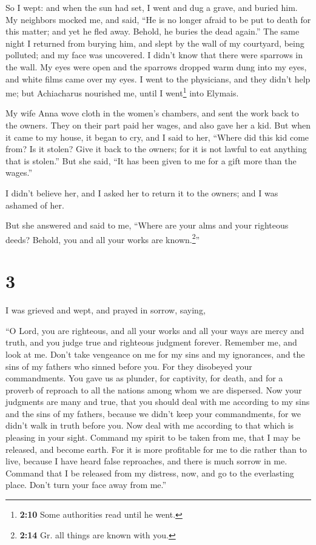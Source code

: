  So I wept: and when the sun had set, I went and dug a
grave, and buried him.  My neighbors mocked me, and said,
``He is no longer afraid to be put to death for this matter; and yet he
fled away. Behold, he buries the dead again.''  The same
night I returned from burying him, and slept by the wall of my
courtyard, being polluted; and my face was uncovered.  I
didn't know that there were sparrows in the wall. My eyes were open and
the sparrows dropped warm dung into my eyes, and white films came over
my eyes. I went to the physicians, and they didn't help me; but
Achiacharus nourished me, until I went\footnote{\textbf{2:10} Some
  authorities read until he went.} into Elymais.

 My wife Anna wove cloth in the women's chambers,
 and sent the work back to the owners. They on their part
paid her wages, and also gave her a kid.  But when it
came to my house, it began to cry, and I said to her, ``Where did this
kid come from? Is it stolen? Give it back to the owners; for it is not
lawful to eat anything that is stolen.''  But she said,
``It has been given to me for a gift more than the wages.''

I didn't believe her, and I asked her to return it to the owners; and I
was ashamed of her.

But she answered and said to me, ``Where are your alms and your
righteous deeds? Behold, you and all your works are known.\footnote{\textbf{2:14}
  Gr. all things are known with you.}''

\hypertarget{section-2}{%
\section{3}\label{section-2}}

 I was grieved and wept, and prayed in sorrow, saying,

 ``O Lord, you are righteous, and all your works and all
your ways are mercy and truth, and you judge true and righteous judgment
forever.  Remember me, and look at me. Don't take
vengeance on me for my sins and my ignorances, and the sins of my
fathers who sinned before you.  For they disobeyed your
commandments. You gave us as plunder, for captivity, for death, and for
a proverb of reproach to all the nations among whom we are dispersed.
 Now your judgments are many and true, that you should
deal with me according to my sins and the sins of my fathers, because we
didn't keep your commandments, for we didn't walk in truth before you.
 Now deal with me according to that which is pleasing in
your sight. Command my spirit to be taken from me, that I may be
released, and become earth. For it is more profitable for me to die
rather than to live, because I have heard false reproaches, and there is
much sorrow in me. Command that I be released from my distress, now, and
go to the everlasting place. Don't turn your face away from me.''

